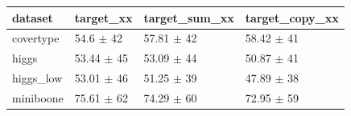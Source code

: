 \begin{tabular}{llll}
\toprule
dataset & target\_xx & target\_sum\_xx & target\_copy\_xx \\
\midrule
covertype & 54.6 $\pm$ 42 & 57.81 $\pm$ 42 & 58.42 $\pm$ 41 \\
higgs & 53.44 $\pm$ 45 & 53.09 $\pm$ 44 & 50.87 $\pm$ 41 \\
higgs\_low & 53.01 $\pm$ 46 & 51.25 $\pm$ 39 & 47.89 $\pm$ 38 \\
miniboone & 75.61 $\pm$ 62 & 74.29 $\pm$ 60 & 72.95 $\pm$ 59 \\
\bottomrule
\end{tabular}
